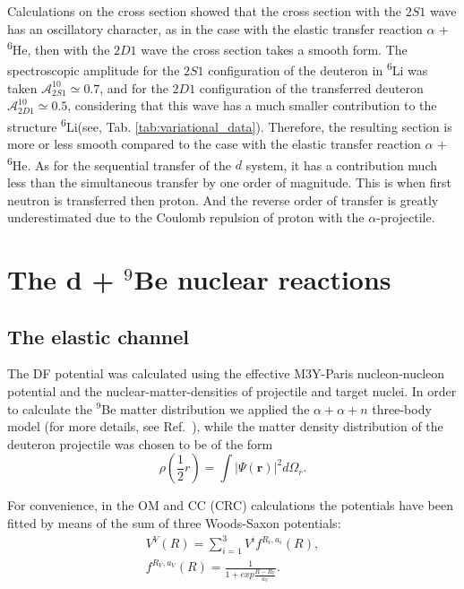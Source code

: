 \documentclass[
12pt, %
oneside, %
english, %
onehalfspacing, %
onehalfspacing, %
headsepline, %
]{MastersDoctoralThesis} %
\newcommand{\he}{\textsuperscript{6}He\xspace}
\newcommand{\li}{\textsuperscript{6}Li\xspace}
\begin{document}
Calculations on the cross section showed that the cross section with the $2S1$ wave has an oscillatory character, as in the case with the elastic transfer reaction $\alpha$ + \he, then with the $2D1$ wave the cross section takes a smooth form. 
The spectroscopic amplitude for the $2S1$ configuration of the deuteron in \li was taken $ \mathcal {A}^{10} _ {2S1} \simeq 0.7 $, and for the $2D1$ configuration of the transferred deuteron $ \mathcal{A}^ {10}_{2D1} \simeq 0.5 $, considering that this wave has a much smaller contribution to the structure \li (see, Tab. \ref{tab:variational_data}). Therefore, the resulting section is more or less smooth compared to the case with the elastic transfer reaction $\alpha$ + \he.
As for the sequential transfer of the $d$ system, it has a contribution much less than the simultaneous transfer by one order of magnitude. This is when first neutron is transferred then proton. And the reverse order of transfer is greatly underestimated due to the Coulomb repulsion of proton with the $\alpha$-projectile.

\clearpage





\section{The d + $^9$Be nuclear reactions}

\subsection{The elastic channel}
The DF potential was calculated using the effective M3Y-Paris nucleon-nucleon potential and the nuclear-matter-densities of projectile and target nuclei. In order to calculate the ${}^9$Be matter distribution we applied the $\alpha+\alpha+n$ three-body model (for more details, see Ref.~\cite{urazbekov2016}), while the matter density distribution of the deuteron projectile was chosen to be of the form
\begin{equation}
\rho\left( \frac{1}{2}r \right) =\int \vert \Psi (\textbf{r}) \vert ^2 d \Omega_r.
\end{equation}

For convenience, in the OM and CC (CRC) calculations the potentials have been fitted by means of the sum of three Woods-Saxon potentials:
\begin{eqnarray}
V^V(R) =  \sum_{i=1}^{3} V^i f^{R_i, a_i}(R), \\
 f^{R_V,a_V}(R)=\frac{1}{1+exp{\frac{R-R_V}{a_V}}}.
\end{eqnarray}
\end{document}
